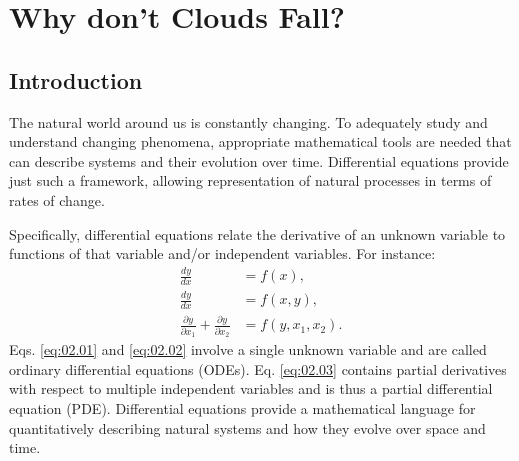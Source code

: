\chapter{Why don't Clouds Fall?}
\label{ch:02} 



\vspace{1cm}

\section{Introduction}

The natural world around us is constantly changing. To adequately study and understand changing phenomena, appropriate mathematical tools are needed that can describe systems and their evolution over time. Differential equations provide just such a framework, allowing representation of natural processes in terms of rates of change.

Specifically, differential equations relate the derivative of an unknown variable to functions of that variable and/or independent variables. For instance:
\begin{align}
    \frac{dy}{dx} & =  f(x),\label{eq:02.01} \\ 
    \frac{dy}{dx} & =  f(x,y),\label{eq:02.02} \\
    \frac{\partial y}{\partial x_1} + \frac{\partial y}{\partial x_2} & =  f(y, x_1, x_2). \label{eq:02.03}
\end{align}
Eqs. \eqref{eq:02.01} and \eqref{eq:02.02} involve a single unknown variable and are called ordinary differential equations (ODEs). Eq. \eqref{eq:02.03} contains partial derivatives with respect to multiple independent variables and is thus a partial differential equation (PDE). Differential equations provide a mathematical language for quantitatively describing natural systems and how they evolve over space and time.


